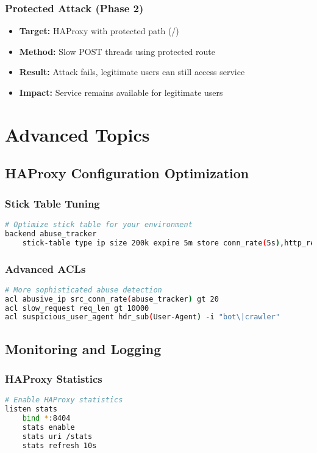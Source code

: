 \documentclass[12pt]{article}
\begin{document}
\subsubsection{Protected Attack (Phase 2)}
\begin{itemize}
    \item \textbf{Target:} HAProxy with protected path (/)
    \item \textbf{Method:} Slow POST threads using protected route
    \item \textbf{Result:} Attack fails, legitimate users can still access service
    \item \textbf{Impact:} Service remains available for legitimate users
\end{itemize}

\section{Advanced Topics}

\subsection{HAProxy Configuration Optimization}

\subsubsection{Stick Table Tuning}
\begin{lstlisting}[language=bash]
# Optimize stick table for your environment
backend abuse_tracker
    stick-table type ip size 200k expire 5m store conn_rate(5s),http_req_rate(10s)
\end{lstlisting}

\subsubsection{Advanced ACLs}
\begin{lstlisting}[language=bash]
# More sophisticated abuse detection
acl abusive_ip src_conn_rate(abuse_tracker) gt 20
acl slow_request req_len gt 10000
acl suspicious_user_agent hdr_sub(User-Agent) -i "bot\|crawler"
\end{lstlisting}

\subsection{Monitoring and Logging}

\subsubsection{HAProxy Statistics}
\begin{lstlisting}[language=bash]
# Enable HAProxy statistics
listen stats
    bind *:8404
    stats enable
    stats uri /stats
    stats refresh 10s
\end{lstlisting}
\end{document}

